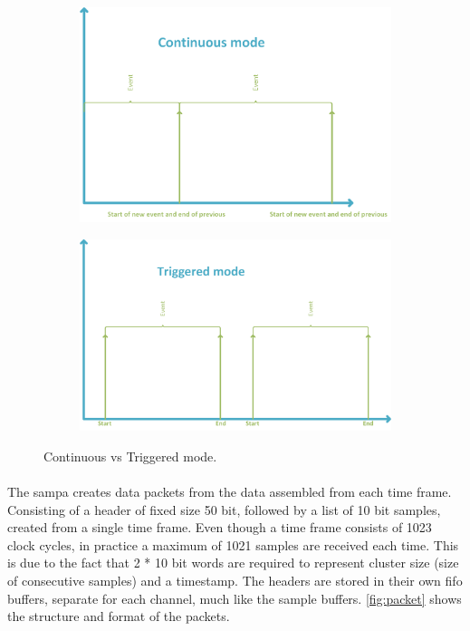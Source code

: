 \documentclass[a4paper, 12pt, openright, twoside]{report}
\begin{document}
\begin{figure}[t!]
	\centering
		\begin{subfigure}[]{0.9\textwidth}
			\label{fig:cont}
			\includegraphics[width=\textwidth]{images/cont-mode.png}
		\end{subfigure}
		\begin{subfigure}[]{0.9\textwidth}
			\label{fig:trig}
			\includegraphics[width=\textwidth]{images/triggered-mode.png}
		\end{subfigure}
	\caption{Continuous vs Triggered mode.}
	\label{fig:cont-vs-trig}
\end{figure}

\paragraph{}
The \gls{sampa} creates data packets from the data assembled from each time frame.
Consisting of a header of fixed size 50 bit, followed by a list of 10 bit samples, created from a single time frame.
Even though a time frame consists of 1023 clock cycles, in practice a maximum of 1021 samples are received each time.
This is due to the fact that 2 * 10 bit words are required to represent cluster size (size of consecutive samples) and a timestamp.
The headers are stored in their own \gls{fifo} buffers, separate for each channel, much like the sample buffers.
\ref{fig:packet} shows the structure and format of the packets.
\end{document}
